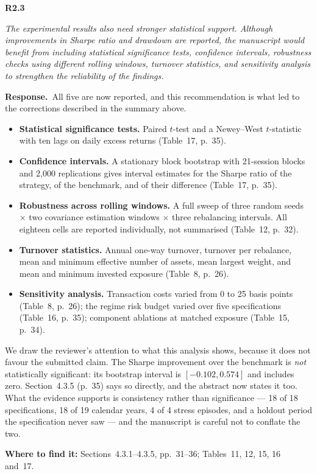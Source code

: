 \documentclass[11pt,a4paper]{article}
\newcommand{\rc}[2]{%
  \par\medskip\noindent
  \colorbox{qbg}{\parbox{\dimexpr\linewidth-2\fboxsep}{%
  \textbf{#1}\par\smallskip\itshape #2}}\par\nopagebreak}
\newcommand{\resp}{\par\medskip\noindent\textbf{Response.}\ }
\newcommand{\where}[1]{\par\smallskip\noindent\textcolor{blue!55!black}{\textbf{Where to find it:} #1}\par}
\begin{document}
\rc{R2.3}{The experimental results also need stronger statistical support. Although
improvements in Sharpe ratio and drawdown are reported, the manuscript would benefit from
including statistical significance tests, confidence intervals, robustness checks using
different rolling windows, turnover statistics, and sensitivity analysis to strengthen the
reliability of the findings.}

\resp All five are now reported, and this recommendation is what led to the corrections
described in the summary above.

\begin{itemize}
\item \textbf{Statistical significance tests.} Paired $t$-test and a Newey--West
$t$-statistic with ten lags on daily excess returns (Table~17, p.~35).
\item \textbf{Confidence intervals.} A stationary block bootstrap with 21-session blocks
and 2{,}000 replications gives interval estimates for the Sharpe ratio of the strategy, of
the benchmark, and of their difference (Table~17, p.~35).
\item \textbf{Robustness across rolling windows.} A full sweep of three random seeds
$\times$ two covariance estimation windows $\times$ three rebalancing intervals. All
eighteen cells are reported individually, not summarised (Table~12, p.~32).
\item \textbf{Turnover statistics.} Annual one-way turnover, turnover per rebalance, mean
and minimum effective number of assets, mean largest weight, and mean and minimum invested
exposure (Table~8, p.~26).
\item \textbf{Sensitivity analysis.} Transaction costs varied from 0 to 25 basis points
(Table~8, p.~26); the regime risk budget varied over five specifications (Table~16,
p.~35); component ablations at matched exposure (Table~15, p.~34).
\end{itemize}

We draw the reviewer's attention to what this analysis shows, because it does not favour
the submitted claim. The Sharpe improvement over the benchmark is \emph{not} statistically
significant: its bootstrap interval is $[-0.102, 0.574]$ and includes zero. Section~4.3.5
(p.~35) says so directly, and the abstract now states it too. What the evidence supports is
consistency rather than significance --- 18 of 18 specifications, 18 of 19 calendar years,
4 of 4 stress episodes, and a holdout period the specification never saw --- and the
manuscript is careful not to conflate the two.
\where{Sections~4.3.1--4.3.5, pp.~31--36; Tables~11, 12, 15, 16 and~17.}
\end{document}
